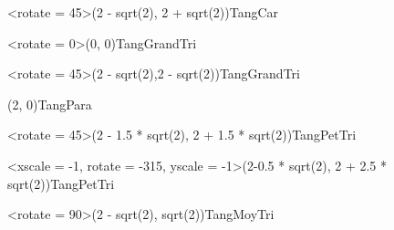 \documentclass{standalone}
\begin{document}
\begin{EnvTangramTikz}
		\PieceTangram[TangSol]<rotate = 45>({2 - sqrt(2)}, {2 + sqrt(2)}){TangCar}
		
		\PieceTangram[TangSol]<rotate = 0>({0}, {0}){TangGrandTri}
		
		\PieceTangram[TangSol]<rotate = 45>({2 - sqrt(2)},{2 - sqrt(2)}){TangGrandTri}
		
		\PieceTangram[TangSol]({2}, {0}){TangPara}
		
		\PieceTangram[TangSol]<rotate = 45>({2 - 1.5 * sqrt(2)}, {2 + 1.5 * sqrt(2)}){TangPetTri}
		
		\PieceTangram[TangSol]<xscale = -1, rotate = -315, yscale = -1>({2-0.5 * sqrt(2)}, {2 + 2.5 * sqrt(2)}){TangPetTri}
		
		\PieceTangram[TangSol]<rotate = 90>({2 - sqrt(2)}, {sqrt(2)}){TangMoyTri}
\end{EnvTangramTikz}
\end{document}
